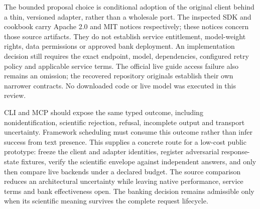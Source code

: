The bounded proposal choice is conditional adoption of the original client behind a thin, versioned adapter,
rather than a wholesale port. The inspected SDK and cookbook carry Apache 2.0 and MIT notices respectively;
these notices concern those source artifacts. They do not establish service entitlement, model-weight rights,
data permissions or approved bank deployment. An implementation decision still requires the exact endpoint,
model, dependencies, configured retry policy and applicable service terms. The official live guide access
failure also remains an omission; the recovered repository originals establish their own narrower contracts.
No downloaded code or live model was executed in this review.~\citep{exec28_oa_sdk,exec28_oa_cookbook}

CLI and MCP should expose the same typed outcome, including nonidentification, scientific rejection, refusal,
incomplete output and transport uncertainty. Framework scheduling must consume this outcome rather than infer
success from text presence. This supplies a concrete route for a low-cost public prototype: freeze the client
and adapter identities, register adversarial response-state fixtures, verify the scientific envelope against
independent answers, and only then compare live backends under a declared budget. The source comparison reduces
an architectural uncertainty while leaving native performance, service terms and bank effectiveness open.
The banking decision remains admissible only when its scientific meaning survives the complete request lifecycle.
